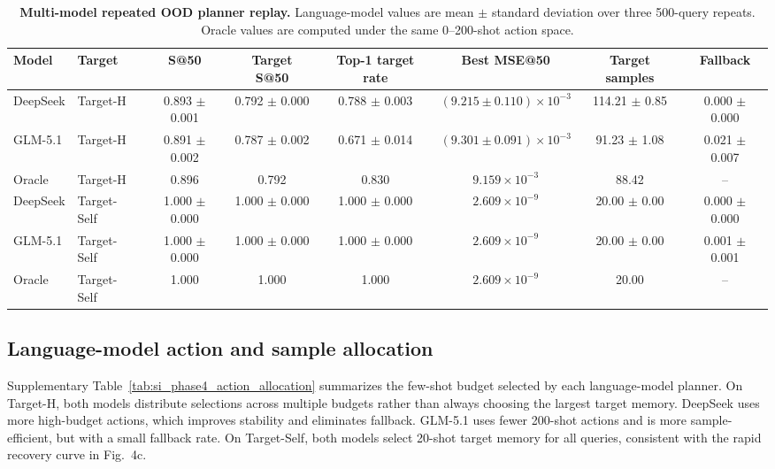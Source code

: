 \documentclass[final,1p,times]{elsarticle}
\begin{document}
\begin{table}[htbp!]
\centering
\caption{\textbf{Multi-model repeated OOD planner replay.}
Language-model values are mean $\pm$ standard deviation over three 500-query repeats. Oracle values are computed under the same 0--200-shot action space.}
\label{tab:si_phase4_multimodel_repeats}
\footnotesize
\setlength{\tabcolsep}{3.8pt}
\renewcommand{\arraystretch}{1.12}
\begin{tabular}{llcccccc}
\toprule
Model & Target & S@50 & Target S@50 & Top-1 target rate & Best MSE@50 & Target samples & Fallback \\
\midrule
DeepSeek & Target-H & 0.893 $\pm$ 0.001 & 0.792 $\pm$ 0.000 & 0.788 $\pm$ 0.003 & $(9.215\pm0.110)\times10^{-3}$ & 114.21 $\pm$ 0.85 & 0.000 $\pm$ 0.000 \\
GLM-5.1 & Target-H & 0.891 $\pm$ 0.002 & 0.787 $\pm$ 0.002 & 0.671 $\pm$ 0.014 & $(9.301\pm0.091)\times10^{-3}$ & 91.23 $\pm$ 1.08 & 0.021 $\pm$ 0.007 \\
Oracle & Target-H & 0.896 & 0.792 & 0.830 & $9.159\times10^{-3}$ & 88.42 & -- \\
\midrule
DeepSeek & Target-Self & 1.000 $\pm$ 0.000 & 1.000 $\pm$ 0.000 & 1.000 $\pm$ 0.000 & $2.609\times10^{-9}$ & 20.00 $\pm$ 0.00 & 0.000 $\pm$ 0.000 \\
GLM-5.1 & Target-Self & 1.000 $\pm$ 0.000 & 1.000 $\pm$ 0.000 & 1.000 $\pm$ 0.000 & $2.609\times10^{-9}$ & 20.00 $\pm$ 0.00 & 0.001 $\pm$ 0.001 \\
Oracle & Target-Self & 1.000 & 1.000 & 1.000 & $2.609\times10^{-9}$ & 20.00 & -- \\
\bottomrule
\end{tabular}
\end{table}

\subsection{Language-model action and sample allocation}

Supplementary Table~\ref{tab:si_phase4_action_allocation} summarizes the few-shot budget selected by each language-model planner. On Target-H, both models distribute selections across multiple budgets rather than always choosing the largest target memory. DeepSeek uses more high-budget actions, which improves stability and eliminates fallback. GLM-5.1 uses fewer 200-shot actions and is more sample-efficient, but with a small fallback rate. On Target-Self, both models select 20-shot target memory for all queries, consistent with the rapid recovery curve in Fig.~4c.
\end{document}
